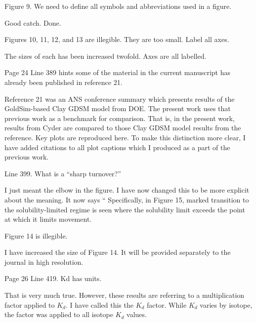 \documentclass[answers,12pt]{exam}
\begin{document}
\begin{questions}
 

\question Figure 9. We need to define all symbols and abbreviations used in a figure.
\begin{solution}
Good catch. Done.
\end{solution}

 

\question Figures 10, 11, 12, and 13 are illegible. They are too small. Label all axes.
\begin{solution}
The sizes of each has been increased twofold. Axes are all labelled. 
\end{solution}

\question Page 24 Line 389 hints some of the material in the current manuscript has already been published in reference 21.
\begin{solution}
        Reference 21 was an ANS conference summary which presents results of 
        the GoldSim-based Clay GDSM model from DOE. The present work uses that 
        previous work as a benchmark for comparison. That is, in the present 
        work, results from Cyder are compared to those Clay GDSM model results 
        from the reference. Key plots are reproduced here. To make this 
        distinction more clear, I have added citations to all plot captions 
        which I produced as a part of the previous work.
\end{solution}


\question Line 399. What is a ``sharp turnover?''
\begin{solution}
I just meant the elbow in the figure. I have now changed this to be more 
        explicit about the meaning. It now says `` Specifically, in Figure 15, 
        marked transition to the solubility-limited regime is seen where the 
        solubility limit exceeds the point at which it limits movement.  
\end{solution}

 

\question Figure 14 is illegible.
\begin{solution}
I have increased the size of Figure 14.
        It will be provided separately to the journal in high resolution. 

\end{solution}

 

\question Page 26 Line 419. Kd has units.
\begin{solution}
That is very much true. However, these results are referring to a 
        multiplication factor applied to $K_d$. I have called this the $K_d$ 
        factor. While $K_d$ varies by isotope, the factor was applied to all 
        isotope $K_d$ values. 
\end{solution}



\end{questions}
\end{document}
